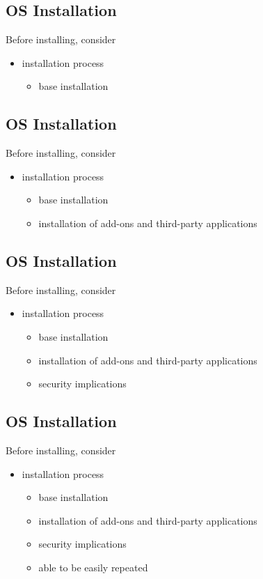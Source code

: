 \documentclass[xga]{xdvislides}
\begin{document}
\subsection{OS Installation}
Before installing, consider
\begin{itemize}
	\item installation process
		\begin{itemize}
			\item base installation
		\end{itemize}
\end{itemize}

\subsection{OS Installation}
Before installing, consider
\begin{itemize}
	\item installation process
		\begin{itemize}
			\item base installation
			\item installation of add-ons and third-party applications
		\end{itemize}
\end{itemize}

\subsection{OS Installation}
Before installing, consider
\begin{itemize}
	\item installation process
		\begin{itemize}
			\item base installation
			\item installation of add-ons and third-party applications
			\item security implications
		\end{itemize}
\end{itemize}

\subsection{OS Installation}
Before installing, consider
\begin{itemize}
	\item installation process
		\begin{itemize}
			\item base installation
			\item installation of add-ons and third-party applications
			\item security implications
			\item able to be easily repeated
		\end{itemize}
\end{itemize}
\end{document}
